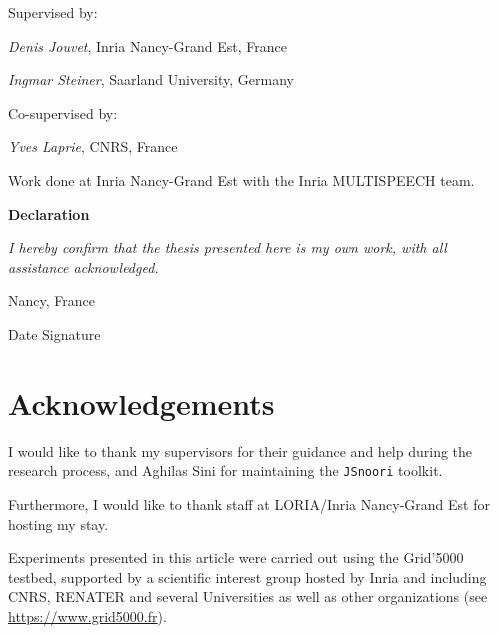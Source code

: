 \thispagestyle{empty}

Supervised by:

\textit{Denis Jouvet}, Inria Nancy-Grand Est, France

\textit{Ingmar Steiner}, Saarland University, Germany

\bigskip

Co-supervised by:

\textit{Yves Laprie}, CNRS, France

\bigskip

Work done at Inria Nancy-Grand Est with the Inria MULTISPEECH team.


\vfill





\noindent \textbf{Declaration}

\smallskip

\textit{I hereby confirm that the thesis presented here is my own work, with all assistance acknowledged.}

\bigskip

\noindent Nancy, France

\bigskip

\noindent Date \hspace{3cm} Signature

\newpage

\thispagestyle{empty}

\section*{Acknowledgements}

I would like to thank my supervisors for their guidance and help during the research process, and Aghilas Sini for maintaining the \texttt{JSnoori} toolkit.

Furthermore, I would like to thank staff at LORIA/Inria Nancy-Grand Est for hosting my stay.

\bigskip

Experiments presented in this article were carried out using the 
Grid'5000 testbed, supported by a scientific interest group hosted by 
Inria and including CNRS, RENATER and several Universities as well as 
other organizations (see \url{https://www.grid5000.fr}).
